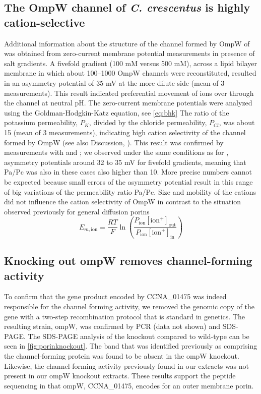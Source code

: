 \subsection{The OmpW channel of \textit{C. crescentus} is highly cation-selective}

Additional information about the structure of the channel formed by OmpW of \caulobacter was obtained from zero-current membrane potential measurements in presence of salt gradients. A fivefold  gradient (100 mM versus 500 mM), across a lipid bilayer membrane in which about 100--1000 OmpW channels were reconstituted, resulted in an asymmetry potential of 35 mV at the more dilute side (mean of 3 measurements). This result indicated preferential movement of  ions over  through the channel at neutral pH. The zero-current membrane potentials were analyzed using the Goldman-Hodgkin-Katz equation, see \cref{eq:bhk} The ratio of the potassium permeability, $P_K$, divided by the chloride permeability, $P_{Cl}$, was about 15 (mean of 3 measurements), indicating high cation selectivity of the channel formed by OmpW (see also Discussion, ). This result was confirmed by measurements with  and ; we observed under the same conditions as for , asymmetry potentials around 32 to 35 mV for fivefold gradients, meaning that Pa/Pc was also in these cases also higher than 10. More precise numbers cannot be expected because small errors of the asymmetry potential result in this range of big variations of the permeability ratio Pa/Pc. Size and mobility of the cations did not influence the cation selectivity of OmpW in contrast to the situation observed previously for general diffusion porins
\begin{equation} \label{eq:bhk}
  E_{m,\text{ion}} = \frac{RT}{F} \ln{ \left( \frac{ P_{\text{ion}}[\text{ion}^{+}]_\mathrm{out}}{ P_{\text{ion}}[\text{ion}^{+}]_\mathrm{in}} \right) }
\end{equation}

\subsection{Knocking out ompW removes channel-forming activity} \label{sec:knocking-out-ompw}

To confirm that the gene product encoded by CCNA\_01475 was indeed responsible for the channel forming activity, we removed the genomic copy of the gene with a two-step recombination protocol that is standard in \caulobacter genetics. The resulting strain, \caulobacter \del ompW, was confirmed by \ac{PCR} (data not shown) and \ac{SDS-PAGE}. The \ac{SDS-PAGE} analysis of the knockout compared to wild-type can be seen in \cref{fig:porinknockout}. The band that was identified previously as comprising the channel-forming protein was found to be absent in the ompW knockout. Likewise, the channel-forming activity previously found in our extracts was not present in our ompW knockout extracts. These results support the peptide sequencing in that ompW, CCNA\_01475, encodes for an outer membrane porin.


